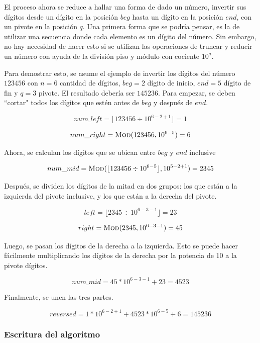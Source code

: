 \documentclass[letter]{article}
\begin{document}
El proceso ahora se reduce a hallar una forma de dado un número, invertir sus dígitos desde un dígito en la posición $beg$ hasta un dígito en la posición $end$, con un pivote en la posición $q$. Una primera forma que se podría pensar, es la de utilizar una secuencia donde cada elemento es un dígito del número. Sin embargo, no hay necesidad de hacer esto si se utilizan las operaciones de truncar y reducir un número con ayuda de la división piso y módulo con cociente $10^a$.

Para demostrar esto, se asume el ejemplo de invertir los dígitos del número $123456$ con $n=6$ cantidad de dígitos, $beg=2$ dígito de inicio, $end=5$ dígito de fin y $q=3$ pivote. El resultado debería ser $145236$. Para empezar, se deben ``cortar" todos los dígitos que estén antes de $beg$ y después de $end$.

\[ num\_left = \lfloor 123456 \div 10^{6-2+1} \rfloor = 1 \]

\vspace{-1.2em}

\[ num\_right = \Call{Mod}{123456, 10^{6-5}} = 6 \]

Ahora, se calculan los dígitos que se ubican entre $beg$ y $end$ inclusive

\[ num\_mid = \Call{Mod}{\lfloor 123456 \div 10^{6-5} \rfloor, 10^{5-2+1}} = 2345 \]

Después, se dividen los dígitos de la mitad en dos grupos: los que están a la izquierda del pivote inclusive, y los que están a la derecha del pivote. \par

\[ left = \lfloor 2345 \div 10^{6 - 3 - 1} \rfloor = 23 \]

\vspace{-1.2em}

\[ right = \Call{Mod}{ 2345, 10^{6 - 3 - 1}} = 45 \]

Luego, se pasan los dígitos de la derecha a la izquierda. Esto se puede hacer fácilmente multiplicando los dígitos de la derecha por la potencia de 10 a la pivote dígitos. \par

\[ num\_mid = 45 * 10^{6 - 3 - 1} + 23 = 4523 \]

Finalmente, se unen las tres partes. \par

\[ reversed = 1 * 10^{6-2+1} + 4523 * 10^{6-5} + 6 = 145236 \]

\newpage

\subsubsection{Escritura del algoritmo} \label{algoritmos:dividir:algoritmo}
\end{document}
